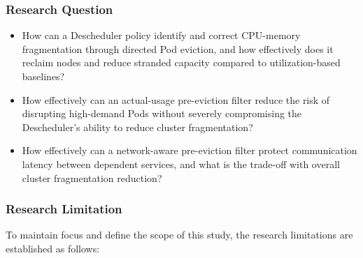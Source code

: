 \subsubsection{Research Question}
\label{sec:researchQuestion}

\begin{itemize}
    \item How can a Descheduler policy identify and correct CPU-memory fragmentation through directed Pod eviction, and how effectively does it reclaim nodes and reduce stranded capacity compared to utilization-based baselines?
    \item How effectively can an actual-usage pre-eviction filter reduce the risk of disrupting high-demand Pods without severely compromising the Descheduler's ability to reduce cluster fragmentation?
    \item How effectively can a network-aware pre-eviction filter protect communication latency between dependent services, and what is the trade-off with overall cluster fragmentation reduction?
\end{itemize}

\subsubsection{Research Limitation}
\label{sec:researchLimitation}

To maintain focus and define the scope of this study, the research limitations are established as follows:

